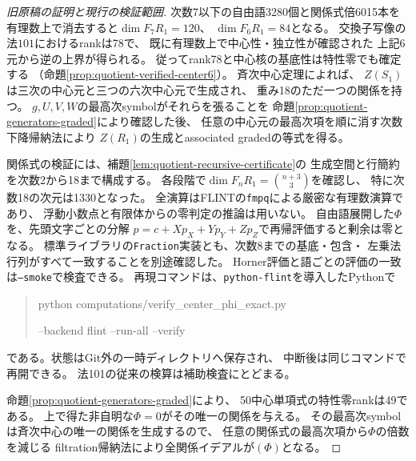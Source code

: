 \begin{proof}[旧原稿の証明と現行の検証範囲]
次数7以下の自由語3280個と関係式倍6015本を
有理数上で消去すると$\dim F_7R_1=120$、
$\dim F_6R_1=84$となる。
交換子写像の法$101$におけるrankは78で、
既に有理数上で中心性・独立性が確認された
上記6元から逆の上界が得られる。
従ってrank78と中心核の基底性は特性零でも確定する
（命題\ref{prop:quotient-verified-center6}）。
斉次中心定理\cite{WWYSklyanin}によれば、
$Z(S_1)$は三次の中心元と三つの六次中心元で生成され、
重み18のただ一つの関係を持つ。
$g,U,V,W$の最高次symbolがそれらを張ることを
命題\ref{prop:quotient-generators-graded}により確認した後、
任意の中心元の最高次項を順に消す次数下降帰納法により
$Z(R_1)$の生成とassociated gradedの等式を得る。

関係式の検証には、補題\ref{lem:quotient-recursive-certificate}の
生成空間と行簡約を次数2から18まで構成する。
各段階で$\dim F_nR_1=\binom{n+3}{3}$を確認し、
特に次数18の次元は1330となった。
全演算はFLINTの\texttt{fmpq}による厳密な有理数演算であり、
浮動小数点と有限体からの零判定の推論は用いない。
自由語展開した$\Phi$を、先頭文字ごとの分解
$p=c+Xp_X+Yp_Y+Zp_Z$で再帰評価すると剰余は零となる。
標準ライブラリの\texttt{Fraction}実装とも、次数8までの基底・包含・
左乗法行列がすべて一致することを別途確認した。
Horner評価と語ごとの評価の一致は\texttt{--smoke}で検査できる。
再現コマンドは、\texttt{python-flint}を導入したPythonで
\begin{quote}\small\ttfamily
python computations/verify\_center\_phi\_exact.py\par
\quad --backend flint --run-all --verify
\end{quote}
である。状態はGit外の一時ディレクトリへ保存され、
中断後は同じコマンドで再開できる。
法101の従来の検算は補助検査にとどまる。

命題\ref{prop:quotient-generators-graded}により、
50中心単項式の特性零rankは49である。
上で得た非自明な$\Phi=0$がその唯一の関係を与える。
その最高次symbolは斉次中心の唯一の関係を生成するので、
任意の関係式の最高次項から$\Phi$の倍数を減じる
filtration帰納法により全関係イデアルが$(\Phi)$となる。
\end{proof}


